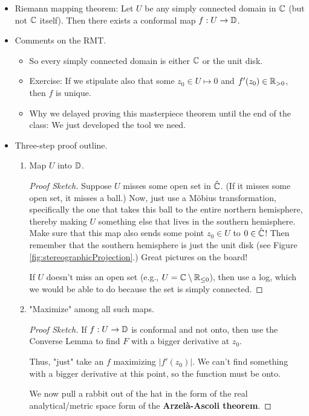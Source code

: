 \documentclass[../notes.tex]{subfiles}
\begin{document}
\begin{itemize}
    \item Riemann mapping theorem: Let $U$ be any simply connected domain in $\mathbb{C}$ (but not $\mathbb{C}$ itself). Then there exists a conformal map $f:U\to\mathbb{D}$.
    \item Comments on the RMT.
    \begin{itemize}
        \item So every simply connected domain is either $\mathbb{C}$ or the unit disk.
        \item Exercise: If we stipulate also that some $z_0\in U\mapsto 0$ and $f'(z_0)\in\mathbb{R}_{>0}$, then $f$ is unique.
        \item Why we delayed proving this masterpiece theorem until the end of the class: We just developed the tool we need.
    \end{itemize}
    \item Three-step proof outline.
    \begin{enumerate}
        \item Map $U$ into $\mathbb{D}$.
        \begin{proof}[Proof Sketch]
            Suppose $U$ misses some open set in $\hat{\mathbb{C}}$. (If it misses some open set, it misses a ball.) Now, just use a M\"{o}bius transformation, specifically the one that takes this ball to the entire northern hemisphere, thereby making $U$ something else that lives in the southern hemisphere. Make sure that this map also sends some point $z_0\in U$ to $0\in\hat{\mathbb{C}}$! Then remember that the southern hemisphere is just the unit disk (see Figure \ref{fig:stereographicProjection}.) Great pictures on the board!\par
            If $U$ doesn't miss an open set (e.g., $U=\mathbb{C}\setminus\mathbb{R}_{\leq 0}$), then use a log, which we would be able to do because the set is simply connected.
        \end{proof}
        \item "Maximize" among all such maps.
        \begin{proof}[Proof Sketch]
            If $f:U\to\mathbb{D}$ is conformal and not onto, then use the Converse Lemma to find $F$ with a bigger derivative at $z_0$.\par
            Thus, "just" take an $f$ maximizing $|f'(z_0)|$. We can't find something with a bigger derivative at this point, so the function must be onto.\par
            We now pull a rabbit out of the hat in the form of the real analytical/metric space form of the \textbf{Arzel\`{a}-Ascoli theorem}.
        \end{proof}

\end{enumerate}
\end{itemize}
\end{document}

